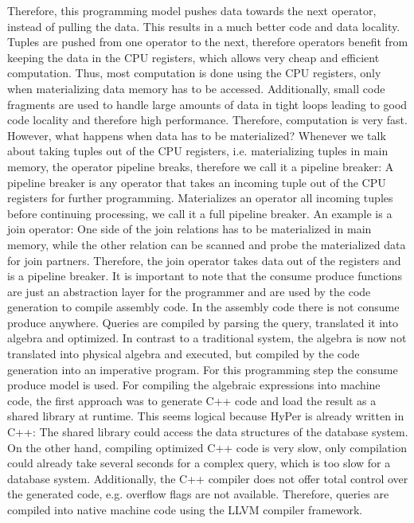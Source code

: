 Therefore, this programming model pushes data towards the next operator, instead of pulling the data. This results in a much better code and data locality. Tuples are pushed from one operator to the next, therefore operators benefit from keeping the data in the CPU registers, which allows very cheap and efficient computation. Thus, most computation is done using the CPU registers, only when materializing data memory has to be accessed. Additionally, small code fragments are used to handle large amounts of data in tight loops leading to good code locality and therefore high performance.
Therefore, computation is very fast. However, what happens when data has to be materialized? Whenever we talk about taking tuples out of the CPU registers, i.e. materializing tuples in main memory, the operator pipeline breaks, therefore we call it a pipeline breaker: A pipeline breaker is any operator that takes an incoming tuple out of the CPU registers for further programming. Materializes an operator all incoming tuples before continuing processing, we call it a full pipeline breaker. An example is a join operator: One side of the join relations has to be materialized in main memory,  while the other relation can be scanned and probe the materialized data for join partners. Therefore, the join operator takes data out of the registers and is a pipeline breaker.
It is important to note that the consume produce functions are just an abstraction layer for the programmer and are used by the code generation to compile assembly code. In the assembly code there is not consume produce anywhere. Queries are compiled by parsing the query, translated it into algebra and optimized. In contrast to a traditional system, the algebra is now not translated into physical algebra and executed, but compiled by the code generation into an imperative program. For this programming step the consume produce model is used.
For compiling the algebraic expressions into machine code, the first approach was to generate C++ code and load the result as a shared library at runtime. This seems logical because HyPer is already written in C++: The shared library could access the data structures of the database system. On the other hand, compiling optimized C++ code is very slow, only compilation could already take several seconds for a complex query, which is too slow for a database system. Additionally, the C++ compiler does not offer total control over the generated code, e.g. overflow flags are not available. Therefore, queries are compiled into native machine code using the LLVM compiler framework. 
